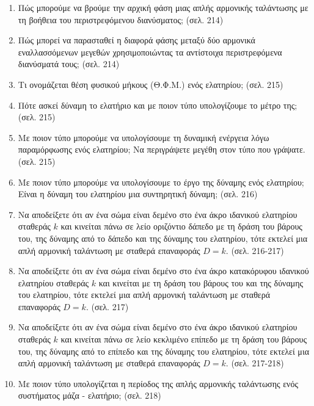 \documentclass{article}
\begin{document}
\begin{enumerate}
      \item Πώς μπορούμε να βρούμε την αρχική φάση μιας απλής αρμονικής ταλάντωσης με τη βοήθεια του περιστρεφόμενου διανύσματος; (σελ. 214)

      \item Πώς μπορεί να παρασταθεί η διαφορά φάσης μεταξύ δύο αρμονικά εναλλασσόμενων μεγεθών χρησιμοποιώντας τα αντίστοιχα περιστρεφόμενα διανύσματά τους; (σελ. 214)

      \item Τι ονομάζεται θέση φυσικού μήκους (Θ.Φ.Μ.) ενός ελατηρίου; (σελ. 215)

      \item Πότε ασκεί δύναμη το ελατήριο και με ποιον τύπο υπολογίζουμε το μέτρο της; (σελ. 215)

      \item Με ποιον τύπο μπορούμε να υπολογίσουμε τη δυναμική ενέργεια λόγω παραμόρφωσης ενός ελατηρίου; Να περιγράψετε μεγέθη στον τύπο που γράψατε. (σελ. 215)

      \item Με ποιον τύπο μπορούμε να υπολογίσουμε το έργο της δύναμης ενός ελατηρίου; Είναι η δύναμη του ελατηρίου μια συντηρητική δύναμη; (σελ. 216)

      \item Να αποδείξετε ότι αν ένα σώμα είναι δεμένο στο ένα άκρο ιδανικού ελατηρίου σταθεράς $k$ και κινείται πάνω σε λείο οριζόντιο δάπεδο με τη δράση του βάρους του, της δύναμης από το δάπεδο και της δύναμης του ελατηρίου, τότε εκτελεί μια απλή αρμονική ταλάντωση με σταθερά επαναφοράς $D = k$. (σελ. 216-217)

      \item Να αποδείξετε ότι αν ένα σώμα είναι δεμένο στο ένα άκρο κατακόρυφου ιδανικού ελατηρίου σταθεράς $k$ και κινείται με τη δράση του βάρους του και της δύναμης του ελατηρίου, τότε εκτελεί μια απλή αρμονική ταλάντωση με σταθερά επαναφοράς $D = k$. (σελ. 217)

      \item Να αποδείξετε ότι αν ένα σώμα είναι δεμένο στο ένα άκρο ιδανικού ελατηρίου σταθεράς $k$ και κινείται πάνω σε λείο κεκλιμένο επίπεδο με τη δράση του βάρους του, της δύναμης από το επίπεδο και της δύναμης του ελατηρίου, τότε εκτελεί μια απλή αρμονική ταλάντωση με σταθερά επαναφοράς $D = k$. (σελ. 217-218)

      \item Με ποιον τύπο υπολογίζεται η περίοδος της απλής αρμονικής ταλάντωσης ενός συστήματος μάζα - ελατήριο; (σελ. 218)


\end{enumerate}
\end{document}

